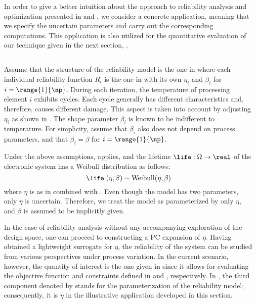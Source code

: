 In order to give a better intuition about the approach to reliability analysis
and optimization presented in  and
, we consider a concrete application, meaning that we
specify the uncertain parameters and carry out the corresponding computations.
This application is also utilized for the quantitative evaluation of our
technique given in the next section, .

\subsection{\problemtitle}

Assume that the structure of the reliability model is the one in
 where each individual reliability function $R_i$ is the
one in  with its own $\eta_i$ and $\beta_i$ for $i =
\range{1}{\np}$. During each iteration, the temperature of processing element
$i$ exhibits  cycles. Each cycle generally has different characteristics
and, therefore, causes different damage. This aspect is taken into account by
adjusting $\eta_i$ as shown in . The shape parameter
$\beta_i$ is known to be indifferent to temperature. For simplicity, assume that
$\beta_i$ also does not depend on process parameters, and that $\beta_i = \beta$
for $i = \range{1}{\np}$.

Under the above assumptions,  applies, and the
lifetime $\life: \Omega \to \real$ of the electronic system has a Weibull
distribution as follows:
\[
  \life | (\eta, \beta) \sim \mathrm{Weibull}(\eta, \beta)
\]
where $\eta$ is as in  combined with
. Even though the model has two parameters, only
$\eta$ is uncertain. Therefore, we treat the model as parameterized by only
$\eta$, and $\beta$ is assumed to be implicitly given.

In the case of reliability analysis without any accompanying exploration of the
design space, one can proceed to constructing a \ac{PC} expansion of $\eta$.
Having obtained a lightweight surrogate for $\eta$, the reliability of the
system can be studied from various perspectives under process variation. In the
current scenario, however, the quantity of interest \g is the one given in
 since it allows for evaluating the objective
function and constraints defined in  and
, respectively. In
, the third component denoted by \life stands
for the parameterization of the reliability model; consequently, it is $\eta$ in
the illustrative application developed in this section.

